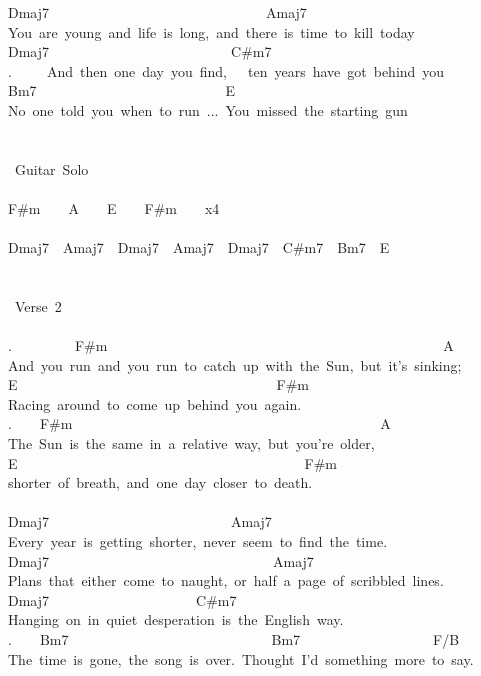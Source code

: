 {Dmaj7\ \ \ \ \ \ \ \ \ \ \ \ \ \ \ \ \ \ \ \ \ \ \ \ \ \ \ \ \ \ \ Amaj7\\
You\ are\ young\ and\ life\ is\ long,\ and\ there\ is\ time\ to\ kill\ today\\
Dmaj7\ \ \ \ \ \ \ \ \ \ \ \ \ \ \ \ \ \ \ \ \ \ \ \ \ \ C\#m7\\
.\ \ \ \ \ And\ then\ one\ day\ you\ find,\ \ \ ten\ years\ have\ got\ behind\ you\\
Bm7\ \ \ \ \ \ \ \ \ \ \ \ \ \ \ \ \ \ \ \ \ \ \ \ \ \ \ E\\
No\ one\ told\ you\ when\ to\ run\ ...\ You\ missed\ the\ starting\ gun\\
\\
\\
\lbrack\ Guitar\ Solo\rbrack\\
\\
F\#m\ \ \ \ A\ \ \ \ E\ \ \ \ F\#m\ \ \ \ x4\\
\\
Dmaj7\ \ Amaj7\ \ Dmaj7\ \ Amaj7\ \ Dmaj7\ \ C\#m7\ \ Bm7\ \ E\\
\\
\\
\lbrack\ Verse\ 2\rbrack\\
\\
.\ \ \ \ \ \ \ \ \ F\#m\ \ \ \ \ \ \ \ \ \ \ \ \ \ \ \ \ \ \ \ \ \ \ \ \ \ \ \ \ \ \ \ \ \ \ \ \ \ \ \ \ \ \ \ \ \ \ \ A\\
And\ you\ run\ and\ you\ run\ to\ catch\ up\ with\ the\ Sun,\ but\ it's\ sinking;\\
E\ \ \ \ \ \ \ \ \ \ \ \ \ \ \ \ \ \ \ \ \ \ \ \ \ \ \ \ \ \ \ \ \ \ \ \ \ F\#m\\
Racing\ around\ to\ come\ up\ behind\ you\ again.\\
.\ \ \ \ F\#m\ \ \ \ \ \ \ \ \ \ \ \ \ \ \ \ \ \ \ \ \ \ \ \ \ \ \ \ \ \ \ \ \ \ \ \ \ \ \ \ \ \ \ \ A\\
The\ Sun\ is\ the\ same\ in\ a\ relative\ way,\ but\ you're\ older,\\
E\ \ \ \ \ \ \ \ \ \ \ \ \ \ \ \ \ \ \ \ \ \ \ \ \ \ \ \ \ \ \ \ \ \ \ \ \ \ \ \ \ F\#m\\
shorter\ of\ breath,\ and\ one\ day\ closer\ to\ death.\\
\\
Dmaj7\ \ \ \ \ \ \ \ \ \ \ \ \ \ \ \ \ \ \ \ \ \ \ \ \ \ Amaj7\\
Every\ year\ is\ getting\ shorter,\ never\ seem\ to\ find\ the\ time.\\
Dmaj7\ \ \ \ \ \ \ \ \ \ \ \ \ \ \ \ \ \ \ \ \ \ \ \ \ \ \ \ \ \ \ \ Amaj7\\
Plans\ that\ either\ come\ to\ naught,\ or\ half\ a\ page\ of\ scribbled\ lines.\\
Dmaj7\ \ \ \ \ \ \ \ \ \ \ \ \ \ \ \ \ \ \ \ \ C\#m7\\
Hanging\ on\ in\ quiet\ desperation\ is\ the\ English\ way.\\
.\ \ \ \ Bm7\ \ \ \ \ \ \ \ \ \ \ \ \ \ \ \ \ \ \ \ \ \ \ \ \ \ \ \ \ Bm7\ \ \ \ \ \ \ \ \ \ \ \ \ \ \ \ \ \ \ F/B\\
The\ time\ is\ gone,\ the\ song\ is\ over.\ Thought\ I'd\ something\ more\ to\ say.}
